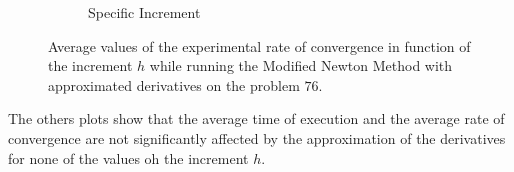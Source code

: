 \begin{figure}[htbp]
\begin{subfigure}[t]{0.45\textwidth}
        \caption{Specific Increment }
    \end{subfigure}
    \caption{ \small Average values of the experimental rate of convergence in function of the increment $h$  while running the Modified Newton Method with approximated derivatives on the problem $76$.}
\end{figure}


The others plots show that the average time of execution and the average rate of convergence are not significantly affected by the approximation of the derivatives for none of the values oh the increment $h$.